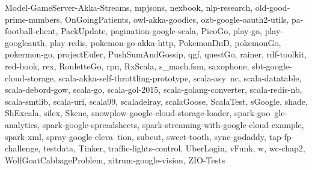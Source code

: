 \documentclass[onecolumn]{article}
\begin{document}
Model-GameServer-Akka-Streams, mpjsons, nexbook, nlp-research, old-good-prime-numbers, OnGoingPatients, owl-akka-goodies, ozb-google-oauth2-utils, pa-football-client, PackUpdate, pagination-google-scala, PicoGo, play-go, play-googleauth, play-redis, pokemon-go-akka-http, PokemonDnD, pokemonGo, pokermon-go, projectEuler, PushSumAndGossip, qgf, questGo, rainer, rdf-toolkit, red-book, rex, RouletteGo, rpn, RxScala, s\_mach.fsm, saxophone, sbt-google-cloud-storage, scala-akka-self-throttling-prototype, scala-asy\ nc, scala-datatable, scala-debord-gow, scala-go, scala-gol-2015, scala-golang-converter, scala-redis-nb, scala-smtlib, scala-uri, scala99, scaladelray, scalaGoose, ScalaTest, sGoogle, shade, ShExcala, silex, Skene, snowplow-google-cloud-storage-loader, spark-goo\ gle-analytics, spark-google-spreadsheets, spark-streaming-with-google-cloud-example, spark-xml, spray-google-eleva\ tion, subcut, sweet-tooth, sync-godaddy, tap-fp-challenge, testdata, Tinker, traffic-lights-control, UberLogin, vFunk, w, wc-chap2, WolfGoatCabbageProblem, xitrum-google-vision, ZIO-Tests
\end{document}
